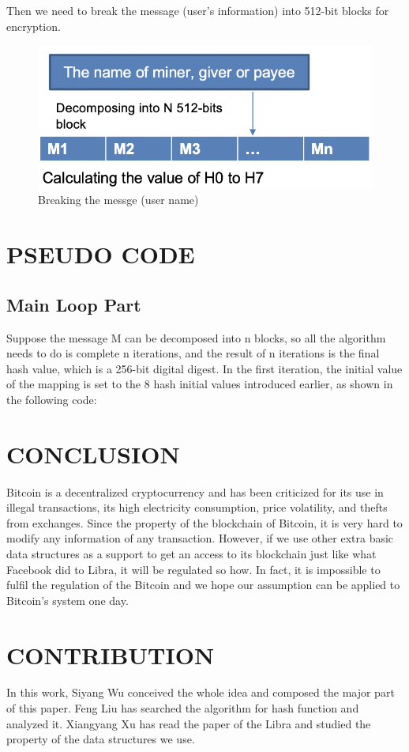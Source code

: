 \documentclass[conference]{IEEEtran}
\begin{document}
Then we need to break the message (user’s information) into 512-bit blocks for encryption.

\begin{figure}[ht]
	\centering
	\includegraphics[scale=0.3]{fig2.png}
	\caption{Breaking the messge (user name)}
	\label{fig:label}
\end{figure}


\section{PSEUDO CODE}
\subsection{Main Loop Part}
Suppose the message M can be decomposed into n blocks, so all the algorithm needs to do is complete n iterations, and the result of n iterations is the final hash value, which is a 256-bit digital digest. In the first iteration, the initial value of the mapping is set to the 8 hash initial values introduced earlier, as shown in the following code:

\section{CONCLUSION}
Bitcoin is a decentralized cryptocurrency and has been criticized for its use in illegal transactions, its high electricity consumption, price volatility, and thefts from exchanges. Since the property of the blockchain of Bitcoin, it is very hard to modify any information of any transaction. However, if we use other extra basic data structures as a support to get an access to its blockchain just like what Facebook did to Libra, it will be regulated so how. In fact, it is impossible to fulfil the regulation of the Bitcoin and we hope our assumption can be applied to Bitcoin’s system one day.

\section{CONTRIBUTION}
In this work, Siyang Wu conceived the whole idea and composed the major part of this paper. Feng Liu has searched the algorithm for hash function and analyzed it. Xiangyang Xu has read the paper of the Libra and studied the property of the data structures we use.  
\end{document}
